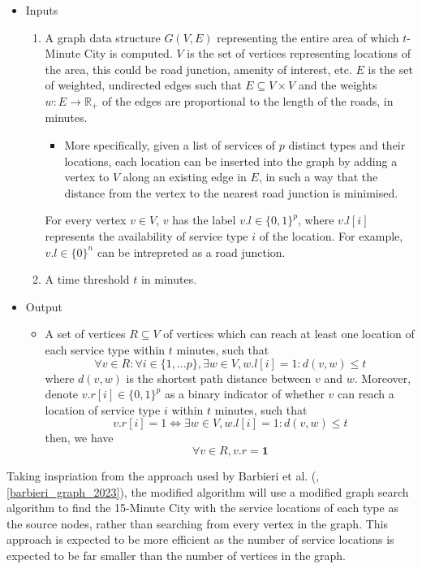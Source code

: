 \begin{itemize}
    \item Inputs
    \begin{enumerate}
        \item A graph data structure $G(V,E)$ representing the entire area of which $t$-Minute City is computed. $V$ is the set of vertices representing locations of the area, this could be road junction, amenity of interest, etc. $E$ is the set of weighted, undirected edges such that $E\subseteq V\times V$ and the weights $w:E\rightarrow\mathbb{R}_{+}$ of the edges are proportional to the length of the roads, in minutes.
        \begin{itemize}
            \item More specifically, given a list of services of $p$ distinct types and their locations, each location can be inserted into the graph by adding a vertex to $V$ along an existing edge in $E$, in such a way that the distance from the vertex to the nearest road junction is minimised.
        \end{itemize}
        For every vertex $v\in V$, $v$ has the label $v.l\in\{0,1\}^p$, where $v.l[i]$ represents the availability of service type $i$ of the location. For example, $v.l\in\{0\}^n$ can be intrepreted as a road junction.
        \item A time threshold $t$ in minutes.
    \end{enumerate}
    \item Output
    \begin{itemize}
        \item[] A set of vertices $R\subseteq V$ of vertices which can reach at least one location of each service type within $t$ minutes, such that        $$\forall v\in R:\forall i\in\{1,...p\},\exists w\in V, w.l[i]=1:d(v,w)\leq t$$ where $d(v,w)$ is the shortest path distance between $v$ and $w$. Moreover, denote $v.r[i]\in\{0,1\}^p$ as a binary indicator of whether $v$ can reach a location of service type $i$ within $t$ minutes, such that $$v.r[i]=1\iff\exists w\in V, w.l[i]=1:d(v,w)\leq t$$ then, we have $$\forall v\in R, v.r = \mathbf{1}$$
    \end{itemize}
\end{itemize}

Taking inspriation from the approach used by Barbieri et al. (\cite{barbieri_graph_2023}, \ref{barbieri_graph_2023}), the modified algorithm will use a modified graph search algorithm to find the 15-Minute City with the service locations of each type as the source nodes, rather than searching from every vertex in the graph. This approach is expected to be more efficient as the number of service locations is expected to be far smaller than the number of vertices in the graph.

